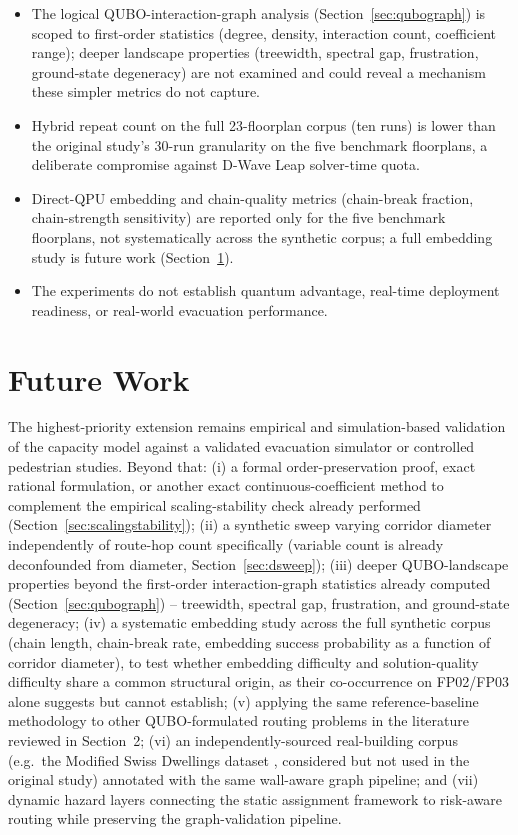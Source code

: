 \documentclass[11pt]{article}
\begin{document}
\begin{itemize}[leftmargin=*]
\item The logical QUBO-interaction-graph analysis (Section~\ref{sec:qubograph}) is scoped to first-order statistics (degree, density, interaction count, coefficient range); deeper landscape properties (treewidth, spectral gap, frustration, ground-state degeneracy) are not examined and could reveal a mechanism these simpler metrics do not capture.
\item Hybrid repeat count on the full 23-floorplan corpus (ten runs) is lower than the original study's 30-run granularity on the five benchmark floorplans, a deliberate compromise against D-Wave Leap solver-time quota.
\item Direct-QPU embedding and chain-quality metrics (chain-break fraction, chain-strength sensitivity) are reported only for the five benchmark floorplans, not systematically across the synthetic corpus; a full embedding study is future work (Section~\ref{sec:futurework}).
\item The experiments do not establish quantum advantage, real-time deployment readiness, or real-world evacuation performance.
\end{itemize}

\section{Future Work}
\label{sec:futurework}

The highest-priority extension remains empirical and simulation-based validation of the capacity model against a validated evacuation simulator or controlled pedestrian studies. Beyond that: (i) a formal order-preservation proof, exact rational formulation, or another exact continuous-coefficient method to complement the empirical scaling-stability check already performed (Section~\ref{sec:scalingstability}); (ii) a synthetic sweep varying corridor diameter independently of route-hop count specifically (variable count is already deconfounded from diameter, Section~\ref{sec:dsweep}); (iii) deeper QUBO-landscape properties beyond the first-order interaction-graph statistics already computed (Section~\ref{sec:qubograph}) -- treewidth, spectral gap, frustration, and ground-state degeneracy; (iv) a systematic embedding study across the full synthetic corpus (chain length, chain-break rate, embedding success probability as a function of corridor diameter), to test whether embedding difficulty and solution-quality difficulty share a common structural origin, as their co-occurrence on FP02/FP03 alone suggests but cannot establish; (v) applying the same reference-baseline methodology to other QUBO-formulated routing problems in the literature reviewed in Section~2; (vi) an independently-sourced real-building corpus (e.g.\ the Modified Swiss Dwellings dataset \cite{msd}, considered but not used in the original study) annotated with the same wall-aware graph pipeline; and (vii) dynamic hazard layers connecting the static assignment framework to risk-aware routing while preserving the graph-validation pipeline.
\end{document}
